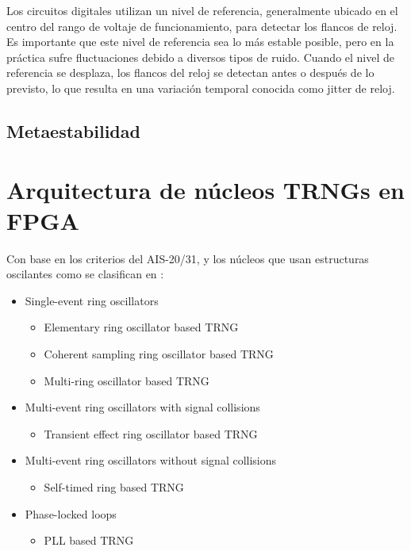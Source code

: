             Los circuitos digitales utilizan un nivel de referencia, generalmente ubicado en el centro del rango de voltaje de funcionamiento, para detectar los flancos de reloj. Es importante que este nivel de referencia sea lo más estable posible, pero en la práctica sufre fluctuaciones debido a diversos tipos de ruido. Cuando el nivel de referencia se desplaza, los flancos del reloj se detectan antes o después de lo previsto, lo que resulta en una variación temporal conocida como jitter de reloj.


        \subsection{Metaestabilidad}


    \section{Arquitectura de núcleos TRNGs en FPGA}

        Con base en los criterios del AIS-20/31, y los núcleos  que usan estructuras oscilantes como se clasifican en \cite{Petura2016}:
	
        \begin{itemize}
            \item Single-event ring oscillators
                \begin{itemize}
                    \item Elementary ring oscillator based TRNG 
                    \item Coherent sampling ring oscillator based TRNG 
                    \item Multi-ring oscillator based TRNG 
                \end{itemize}
            \item Multi-event ring oscillators with signal collisions
                \begin{itemize}
                    \item Transient effect ring oscillator based TRNG 
                \end{itemize}
            \item Multi-event ring oscillators without signal collisions
                \begin{itemize}
                    \item Self-timed ring based TRNG 
                \end{itemize}
            \item Phase-locked loops
                \begin{itemize}
                    \item PLL based TRNG 
                \end{itemize}
        \end{itemize}
	
